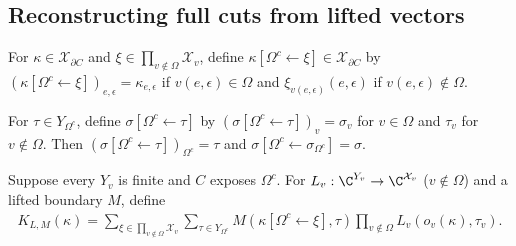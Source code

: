 \subsection{Reconstructing full cuts from lifted vectors}
\label{sec:peps_lifted_cut_reconstruction}

\begin{definition}%
    \label{def:peps_cut_replace_outside}
    \leanok
    For $\kappa\in\mathcal X_{\partial C}$ and
    $\xi\in\prod_{v\notin\Omega}\mathcal X_v$, define
    $\kappa[\Omega^c\leftarrow\xi]\in\mathcal X_{\partial C}$ by
    $(\kappa[\Omega^c\leftarrow\xi])_{e,\epsilon}=\kappa_{e,\epsilon}$ if
    $v(e,\epsilon)\in\Omega$ and $\xi_{v(e,\epsilon)}(e,\epsilon)$ if
    $v(e,\epsilon)\notin\Omega$.
\end{definition}

\begin{definition}%
    \label{def:peps_replace_outside_physical}
    \leanok
    For $\tau\in Y_{\Omega^c}$, define $\sigma[\Omega^c\leftarrow\tau]$ by
    $(\sigma[\Omega^c\leftarrow\tau])_v=\sigma_v$ for $v\in\Omega$ and
    $\tau_v$ for $v\notin\Omega$. Then
    $(\sigma[\Omega^c\leftarrow\tau])_{\Omega^c}=\tau$ and
    $\sigma[\Omega^c\leftarrow\sigma_{\Omega^c}]=\sigma$.
\end{definition}

\begin{definition}%
    \label{def:peps_reconstructed_cut_boundary}
    \leanok
    Suppose every $Y_v$ is finite and $C$ exposes $\Omega^c$. For
    $L_v:\C^{Y_v}\to\C^{\mathcal X_v}$ ($v\notin\Omega$) and a lifted boundary
    $M$, define
    \begin{align}
        K_{L,M}(\kappa)
        =\sum_{\xi\in\prod_{v\notin\Omega}\mathcal X_v}
        \sum_{\tau\in Y_{\Omega^c}}
        M(\kappa[\Omega^c\leftarrow\xi],\tau)
        \prod_{v\notin\Omega}L_v(o_v(\kappa),\tau_v).
        \label{eq:peps_reconstructed_boundary}
    \end{align}
\end{definition}


